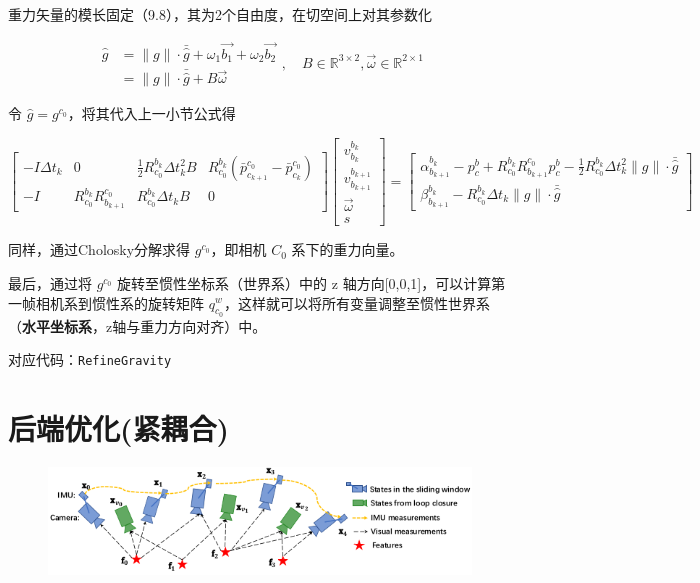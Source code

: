 \documentclass[12pt,a4paper]{article}
\begin{document}
重力矢量的模长固定（9.8），其为2个自由度，在切空间上对其参数化

\begin{equation}
\begin{aligned}
\hat{g} &=
\|g\| \cdot \bar{\hat{g}} + \omega_1 \vec{b_1} + \omega_2 \vec{b_2} \\ &=
\|g\| \cdot \bar{\hat{g}} + B \vec{\omega}
\end{aligned} , \quad
B \in \mathbb{R}^{3 \times 2}, \vec{\omega} \in \mathbb{R}^{2 \times 1}
\end{equation}

令 $\hat{g} = g^{c_{0}}$，将其代入上一小节公式得

\begin{equation}
\begin{bmatrix}
-I\Delta t_{k} & 0 & \frac{1}{2}R^{b_{k}}_{c_{0}} \Delta t_{k}^{2} B &
R^{b_{k}}_{c_{0}}(\bar{p}^{c_{0}}_{c_{k+1}}-\bar{p}^{c_{0}}_{c_{k}}) \\
-I & R^{b_{k}}_{c_{0}} R^{c_0}_{b_{k+1}} & R^{b_{k}}_{c_{0}}\Delta t_{k} B & 0
\end{bmatrix}
\begin{bmatrix}
v^{b_{k}}_{b_{k}}\\
v^{b_{k+1}}_{b_{k+1}}\\
\vec{\omega}\\
s
\end{bmatrix} =
\begin{bmatrix}
\alpha^{b_{k}}_{b_{k+1}} - p_c^b + R^{b_{k}}_{c_{0}} R^{c_0}_{b_{k+1}} p_c^b -
\frac{1}{2}R^{b_{k}}_{c_{0}} \Delta t_{k}^{2} \|g\| \cdot \bar{\hat{g}}\\
\beta ^{b_{k}}_{b_{k+1}} -
R^{b_{k}}_{c_{0}}\Delta t_{k} \|g\| \cdot \bar{\hat{g}}
\end{bmatrix}
\end{equation}

同样，通过Cholosky分解求得 $g^{c_{0}}$，即相机 $C_0$ 系下的重力向量。

最后，通过将 $g^{c_{0}}$ 旋转至惯性坐标系（世界系）中的 z 轴方向[0,0,1]，可以计算第一帧相机系到惯性系的旋转矩阵 $q_{c_0}^w$，这样就可以将所有变量调整至惯性世界系（\textbf{水平坐标系}，z轴与重力方向对齐）中。

对应代码：\verb|RefineGravity|

\section{后端优化(紧耦合)}

\begin{figure}[htbp]
\centering
\includegraphics[scale=0.6]{images/sliding_window_vio.png}
\end{figure}
\end{document}

